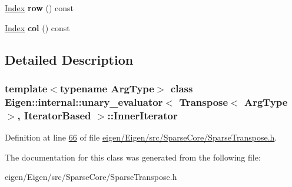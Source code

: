 \begin{DoxyCompactItemize}
\hyperlink{namespace_eigen_a62e77e0933482dafde8fe197d9a2cfde}{Index} {\bfseries row} () const
\item 
\mbox{\label{class_eigen_1_1internal_1_1unary__evaluator_3_01_transpose_3_01_arg_type_01_4_00_01_iterator_based_01_4_1_1_inner_iterator_a136cadb972e0d183cc055f1dff43d9ee}} 
\hyperlink{namespace_eigen_a62e77e0933482dafde8fe197d9a2cfde}{Index} {\bfseries col} () const
\end{DoxyCompactItemize}


\subsection{Detailed Description}
\subsubsection*{template$<$typename Arg\+Type$>$\newline
class Eigen\+::internal\+::unary\+\_\+evaluator$<$ Transpose$<$ Arg\+Type $>$, Iterator\+Based $>$\+::\+Inner\+Iterator}



Definition at line \hyperlink{eigen_2_eigen_2src_2_sparse_core_2_sparse_transpose_8h_source_l00066}{66} of file \hyperlink{eigen_2_eigen_2src_2_sparse_core_2_sparse_transpose_8h_source}{eigen/\+Eigen/src/\+Sparse\+Core/\+Sparse\+Transpose.\+h}.



The documentation for this class was generated from the following file\+:\begin{DoxyCompactItemize}
\item 
eigen/\+Eigen/src/\+Sparse\+Core/\+Sparse\+Transpose.\+h\end{DoxyCompactItemize}
